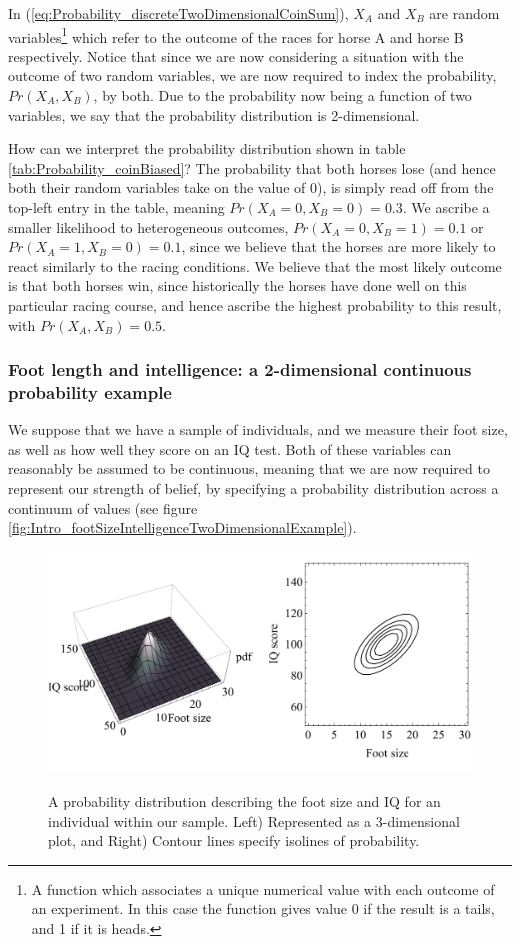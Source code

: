 \documentclass[11pt,fullpage]{book}
\begin{document}
In (\ref{eq:Probability_discreteTwoDimensionalCoinSum}), $X_A$ and $X_B$ are random variables\footnote{A function which associates a unique numerical value with each outcome of an experiment. In this case the function gives value 0 if the result is a tails, and 1 if it is heads.} which refer to the outcome of the races for horse A and horse B respectively. Notice that since we are now considering a situation with the outcome of two random variables, we are now required to index the probability, $Pr(X_A,X_B)$, by both. Due to the probability now being a function of two variables, we say that the probability distribution is 2-dimensional.

How can we interpret the probability distribution shown in table \ref{tab:Probability_coinBiased}? The probability that both horses lose (and hence both their random variables take on the value of 0), is simply read off from the top-left entry in the table, meaning $Pr(X_A=0,X_B=0)=0.3$. We ascribe a smaller likelihood to heterogeneous outcomes, $Pr(X_A=0,X_B=1)=0.1$ or $Pr(X_A=1,X_B=0)=0.1$, since we believe that the horses are more likely to react similarly to the racing conditions. We believe that the most likely outcome is that both horses win, since historically the horses have done well on this particular racing course, and hence ascribe the highest probability to this result, with $Pr(X_A,X_B)=0.5$.

\subsubsection{Foot length and intelligence: a 2-dimensional continuous probability example}
We suppose that we have a sample of individuals, and we measure their foot size, as well as how well they score on an IQ test. Both of these variables can reasonably be assumed to be continuous, meaning that we are now required to represent our strength of belief, by specifying a probability distribution across a continuum of values (see figure \ref{fig:Intro_footSizeIntelligenceTwoDimensionalExample}). 

\begin{figure}
\centering
\scalebox{0.5} 
{\includegraphics{Probability_footSizeIntelligenceTwoDimensionalExample.pdf}}
\caption{A probability distribution describing the foot size and IQ for an individual within our sample. Left) Represented as a 3-dimensional plot, and Right) Contour lines specify isolines of probability.}\label{fig:Probability_footSizeIntelligenceTwoDimensionalExample}
\end{figure}
\end{document}
